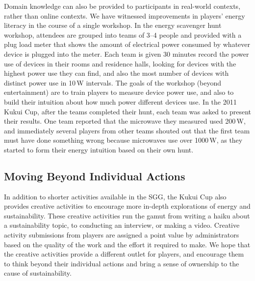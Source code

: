 \documentclass[10pt, conference, compsocconf]{IEEEtran-old}
\begin{document}
Domain knowledge can also be provided to participants in real-world contexts, rather than online contexts. We have witnessed improvements in players' energy literacy in the course of a single workshop. In the energy scavenger hunt workshop, attendees are grouped into teams of 3--4 people and provided with a plug load meter that shows the amount of electrical power consumed by whatever device is plugged into the meter. Each team is given 30 minutes record the power use of devices in their rooms and residence halls, looking for devices with the highest power use they can find, and also the most number of devices with distinct power use in 10\,W intervals. The goals of the workshop (beyond entertainment) are to train players to measure device power use, and also to build their intuition about how much power different devices use. In the 2011 Kukui Cup, after the teams completed their hunt, each team was asked to present their results. One team reported that the microwave they measured used 200\,W, and immediately several players from other teams shouted out that the first team must have done something wrong because microwaves use over 1000\,W, as they started to form their energy intuition based on their own hunt.


\subsection{Moving Beyond Individual Actions}

In addition to shorter activities available in the SGG, the Kukui Cup also provides creative activities to encourage more in-depth explorations of energy and sustainability. These creative activities run the gamut from writing a haiku about a sustainability topic, to conducting an interview, or making a video. Creative activity submissions from players are assigned a point value by administrators based on the quality of the work and the effort it required to make. We hope that the creative activities provide a different outlet for players, and encourage them to think beyond their individual actions and bring a sense of ownership to the cause of sustainability.
\end{document}
